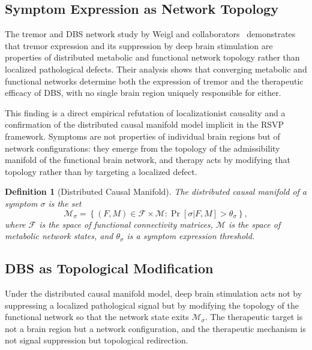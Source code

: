 \documentclass[11pt, oneside]{article}
\numberwithin{equation}{section}
\theoremstyle{rsvpstyle}
\newtheorem{definition}[theorem]{Definition}
\theoremstyle{remark}
\begin{document}
\subsection{Symptom Expression as Network Topology}

The tremor and DBS network study by Weigl and collaborators~\cite{Weigl2026Tremor}
demonstrates that tremor expression and its suppression by deep brain stimulation are
properties of distributed metabolic and functional network topology rather than
localized pathological defects. Their analysis shows that converging metabolic and
functional networks determine both the expression of tremor and the therapeutic
efficacy of DBS, with no single brain region uniquely responsible for either.

This finding is a direct empirical refutation of localizationist causality and a
confirmation of the distributed causal manifold model implicit in the RSVP framework.
Symptoms are not properties of individual brain regions but of network configurations:
they emerge from the topology of the admissibility manifold of the functional brain
network, and therapy acts by modifying that topology rather than by targeting a
localized defect.

\begin{definition}[Distributed Causal Manifold]
The distributed causal manifold of a symptom $\sigma$ is the set
\begin{equation}
  \mathcal{M}_\sigma = \left\{ (F, M) \in \mathcal{F} \times \mathcal{M} :
  \Pr[\sigma | F, M] > \theta_\sigma \right\},
\end{equation}
where $\mathcal{F}$ is the space of functional connectivity matrices, $\mathcal{M}$ is
the space of metabolic network states, and $\theta_\sigma$ is a symptom expression
threshold.
\end{definition}

\subsection{DBS as Topological Modification}

Under the distributed causal manifold model, deep brain stimulation acts not by
suppressing a localized pathological signal but by modifying the topology of the
functional network so that the network state exits $\mathcal{M}_\sigma$. The therapeutic
target is not a brain region but a network configuration, and the therapeutic mechanism
is not signal suppression but topological redirection.
\end{document}
